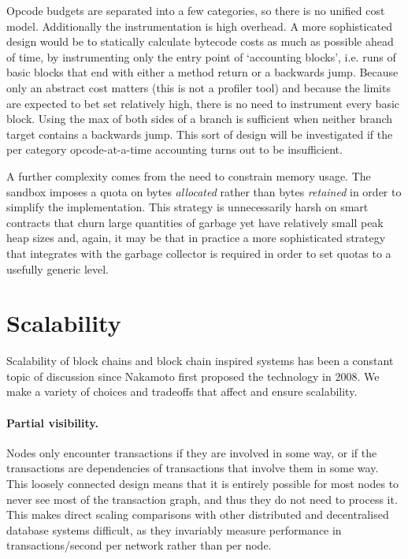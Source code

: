 \documentclass{article}
\begin{document}
Opcode budgets are separated into a few categories, so there is no unified cost model. Additionally the instrumentation is
high overhead. A more sophisticated design would be to statically calculate bytecode costs as much as possible
ahead of time, by instrumenting only the entry point of `accounting blocks', i.e. runs of basic blocks that end
with either a method return or a backwards jump. Because only an abstract cost matters (this is not a profiler
tool) and because the limits are expected to bet set relatively high, there is no need to instrument every basic
block. Using the max of both sides of a branch is sufficient when neither branch target contains a backwards jump.
This sort of design will be investigated if the per category opcode-at-a-time accounting turns out to be
insufficient.

A further complexity comes from the need to constrain memory usage. The sandbox imposes a quota on bytes
\emph{allocated} rather than bytes \emph{retained} in order to simplify the implementation. This strategy is
unnecessarily harsh on smart contracts that churn large quantities of garbage yet have relatively small peak heap
sizes and, again, it may be that in practice a more sophisticated strategy that integrates with the garbage
collector is required in order to set quotas to a usefully generic level.

\section{Scalability}

Scalability of block chains and block chain inspired systems has been a constant topic of discussion since Nakamoto
first proposed the technology in 2008. We make a variety of choices and tradeoffs that affect and ensure
scalability.

\paragraph{Partial visibility.}Nodes only encounter transactions if they are involved in some way, or if the
transactions are dependencies of transactions that involve them in some way. This loosely connected design means
that it is entirely possible for most nodes to never see most of the transaction graph, and thus they do not need
to process it. This makes direct scaling comparisons with other distributed and decentralised database systems
difficult, as they invariably measure performance in transactions/second per network rather than per node.
\end{document}
